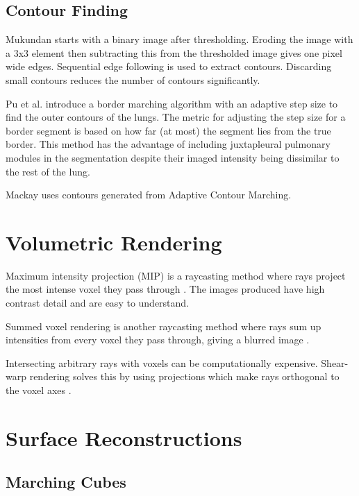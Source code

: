 \documentclass[acmsmall]{acmart}
\begin{document}
\subsection{Contour Finding}

Mukundan \cite{mukundan2016reconstruction} starts with a binary image after thresholding. Eroding the image with a 3x3 element then subtracting this from the thresholded image gives one pixel wide edges. Sequential edge following is used to extract contours. Discarding small contours reduces the number of contours significantly.

Pu et al. \cite{pu2008adaptive} introduce a border marching algorithm with an adaptive step size to find the outer contours of the lungs. The metric for adjusting the step size for a border segment is based on how far (at most) the segment lies from the true border. This method has the advantage of including juxtapleural pulmonary modules in the segmentation despite their imaged intensity being dissimilar to the rest of the lung.

Mackay \cite{mackay2019robust} uses contours generated from Adaptive Contour Marching.

\section{Volumetric Rendering}

Maximum intensity projection (MIP) is a raycasting method where rays project the most intense voxel they pass through \cite{birkfellner2016applied}. The images produced have high contrast detail and are easy to understand.

Summed voxel rendering is another raycasting method where rays sum up intensities from every voxel they pass through, giving a blurred image \cite{birkfellner2016applied}.

Intersecting arbitrary rays with voxels can be computationally expensive. Shear-warp rendering solves this by using projections which make rays orthogonal to the voxel axes \cite{lacroute1994fast}. 


\section{Surface Reconstructions}

\subsection{Marching Cubes}
\end{document}
